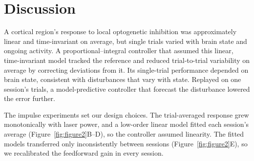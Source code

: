 \section*{Discussion}
A cortical region's response to local optogenetic inhibition was approximately linear and time-invariant on average, but single trials varied with brain state and ongoing activity.
A proportional--integral controller that assumed this linear, time-invariant model tracked the reference and reduced trial-to-trial variability on average by correcting deviations from it.
Its single-trial performance depended on brain state, consistent with disturbances that vary with state.
Replayed on one session's trials, a model-predictive controller that forecast the disturbance lowered the error further.

The impulse experiments set our design choices.
The trial-averaged response grew monotonically with laser power, and a low-order linear model fitted each session's average (Figure~\ref{fig:figure2}B--D), so the controller assumed linearity.
The fitted models transferred only inconsistently between sessions (Figure~\ref{fig:figure2}E), so we recalibrated the feedforward gain in every session.

